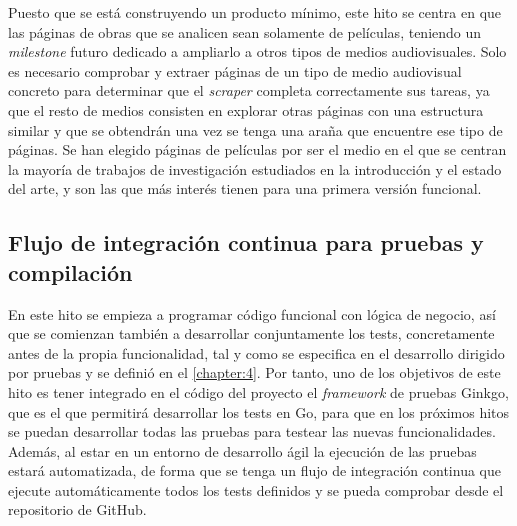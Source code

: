 Puesto que se está construyendo un producto mínimo, este hito se centra en que
las páginas de obras que se analicen sean solamente de películas, teniendo un
\textit{milestone} futuro dedicado a ampliarlo a otros tipos de medios
audiovisuales. Solo es necesario comprobar y extraer páginas de un tipo de medio
audiovisual concreto para determinar que el \textit{scraper} completa
correctamente sus tareas, ya que el resto de medios consisten en explorar otras
páginas con una estructura similar y que se obtendrán una vez se tenga una araña
que encuentre ese tipo de páginas. Se han elegido páginas de películas por ser
el medio en el que se centran la mayoría de trabajos de investigación estudiados
en la introducción y el estado del arte, y son las que más interés tienen para
una primera versión funcional.

\subsection{Flujo de integración continua para pruebas y compilación}
En este hito se empieza a programar código funcional con lógica de negocio, así
que se comienzan también a desarrollar conjuntamente los tests, concretamente
antes de la propia funcionalidad, tal y como se especifica en el desarrollo
dirigido por pruebas \cite{beck2002driven} y se definió en el
\autoref{chapter:4}. Por tanto, uno de los objetivos de este hito es tener
integrado en el código del proyecto el \textit{framework} de pruebas Ginkgo, que
es el que permitirá desarrollar los tests en Go, para que en los próximos hitos
se puedan desarrollar todas las pruebas para testear las nuevas funcionalidades.
Además, al estar en un entorno de desarrollo ágil la ejecución de las pruebas
estará automatizada, de forma que se tenga un flujo de integración continua que
ejecute automáticamente todos los tests definidos y se pueda comprobar desde el
repositorio de GitHub. 

